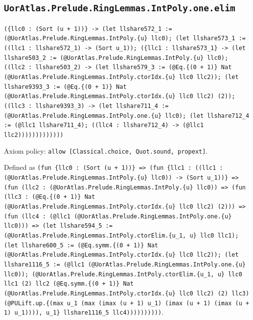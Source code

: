 \documentclass[11pt]{article}
\begin{document}
\subsection*{\texttt{UorAtlas.Prelude.RingLemmas.IntPoly.one.elim}}
\noindent\texttt{(\{llc0 : (Sort (u + 1))\} -> (let llshare572\_1 := (@UorAtlas.Prelude.RingLemmas.IntPoly.\{u\} llc0); (let llshare573\_1 := ((llc1 : llshare572\_1) -> (Sort u\_1)); (\{llc1 : llshare573\_1\} -> (let llshare503\_2 := (@UorAtlas.Prelude.RingLemmas.IntPoly.\{u\} llc0); ((llc2 : llshare503\_2) -> (let llshare579\_3 := (@Eq.\{(0 + 1)\} Nat (@UorAtlas.Prelude.RingLemmas.IntPoly.ctorIdx.\{u\} llc0 llc2)); (let llshare9393\_3 := (@Eq.\{(0 + 1)\} Nat (@UorAtlas.Prelude.RingLemmas.IntPoly.ctorIdx.\{u\} llc0 llc2) (2)); ((llc3 : llshare9393\_3) -> (let llshare711\_4 := (@UorAtlas.Prelude.RingLemmas.IntPoly.one.\{u\} llc0); (let llshare712\_4 := (@llc1 llshare711\_4); ((llc4 : llshare712\_4) -> (@llc1 llc2)))))))))))))}\par
\noindent Axiom policy: \texttt{allow [Classical.choice, Quot.sound, propext]}.\par
\noindent Defined as \texttt{(fun \{llc0 : (Sort (u + 1))\} => (fun \{llc1 : ((llc1 : (@UorAtlas.Prelude.RingLemmas.IntPoly.\{u\} llc0)) -> (Sort u\_1))\} => (fun (llc2 : (@UorAtlas.Prelude.RingLemmas.IntPoly.\{u\} llc0)) => (fun (llc3 : (@Eq.\{(0 + 1)\} Nat (@UorAtlas.Prelude.RingLemmas.IntPoly.ctorIdx.\{u\} llc0 llc2) (2))) => (fun (llc4 : (@llc1 (@UorAtlas.Prelude.RingLemmas.IntPoly.one.\{u\} llc0))) => (let llshare594\_5 := (@UorAtlas.Prelude.RingLemmas.IntPoly.ctorElim.\{u\_1, u\} llc0 llc1); (let llshare600\_5 := (@Eq.symm.\{(0 + 1)\} Nat (@UorAtlas.Prelude.RingLemmas.IntPoly.ctorIdx.\{u\} llc0 llc2)); (let llshare1116\_5 := (@llc1 (@UorAtlas.Prelude.RingLemmas.IntPoly.one.\{u\} llc0)); (@UorAtlas.Prelude.RingLemmas.IntPoly.ctorElim.\{u\_1, u\} llc0 llc1 (2) llc2 (@Eq.symm.\{(0 + 1)\} Nat (@UorAtlas.Prelude.RingLemmas.IntPoly.ctorIdx.\{u\} llc0 llc2) (2) llc3) (@PULift.up.\{(max u\_1 (max (imax (u + 1) u\_1) (imax (u + 1) (imax (u + 1) u\_1)))), u\_1\} llshare1116\_5 llc4))))))))))}.\par
\end{document}
